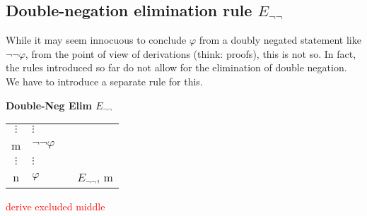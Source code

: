 \documentclass[nobib,nofonts]{tufte-handout}
\begin{document}
\subsection{Double-negation elimination rule $E_{\neg\neg}$}

While it may seem innocuous to conclude $\varphi$ from a doubly negated statement like $\neg\neg\varphi$, from the point of view of derivations (think: proofs), this is not so.
In fact, the rules introduced so far do not allow for the elimination of double negation.
We have to introduce a separate rule for this.

\bigskip
\noindent \colorbox{mygray!60}{\centering
  \begin{minipage}[t]{0.35\linewidth}
    \textbf{Double-Neg Elim $E_{\neg\neg}$}
  \end{minipage}
  \begin{minipage}[t]{0.55\linewidth}
    \begin{tabular}{clcl}
            $\vdots$ & $\vdots$  & \\
      m              & $\neg \neg \varphi$ &  \\
            $\vdots$ & $\vdots$  & \\
      n              & $\varphi$    & & $E_{\neg \neg}$, m
    \end{tabular}
  \end{minipage}
}
\bigskip

\textcolor{red}{derive excluded middle}
\end{document}
